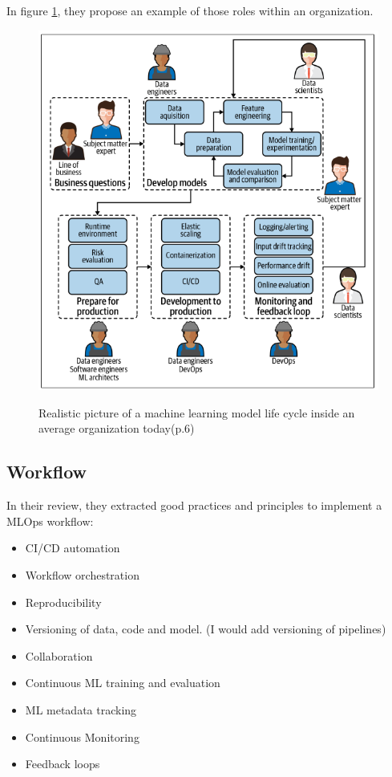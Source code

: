 In figure \ref{fig:mlop-people}, they propose an example of those roles within an organization.
\begin{figure}[!htbp]
    \caption{Realistic picture of a machine learning model life cycle inside an average
    organization today\cite{treveil2020introducing}(p.6)}
    \centering
    \includegraphics[scale=0.5]{images/mlops-people}
    \label{fig:mlop-people}
\end{figure}

\subsection{Workflow}\label{subsec:workflow}

In their review\cite{Kreuzberger2022MachineLO}, they extracted good practices and principles to implement a MLOps workflow:

\begin{itemize}
    \item CI/CD automation
    \item Workflow orchestration
    \item Reproducibility
    \item Versioning of data, code and model. (I would add versioning of pipelines)
    \item Collaboration
    \item Continuous ML training and evaluation
    \item ML metadata tracking
    \item Continuous Monitoring
    \item Feedback loops
\end{itemize}

